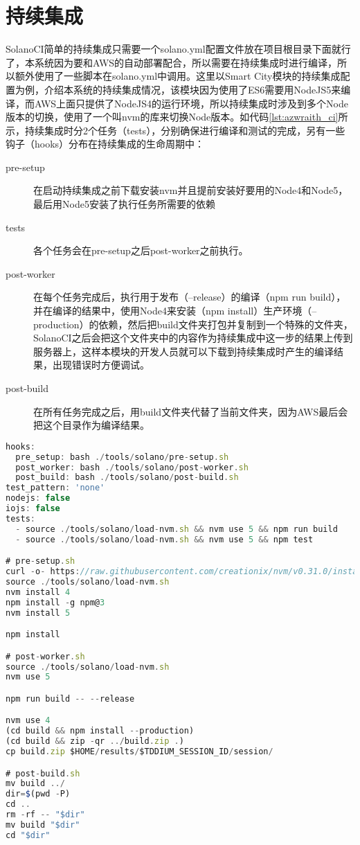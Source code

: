 \section{持续集成}
SolanoCI简单的持续集成只需要一个solano.yml配置文件放在项目根目录下面就行了，本系统因为要和AWS的自动部署配合，所以需要在持续集成时进行编译，所以额外使用了一些脚本在solano.yml中调用。这里以Smart City模块的持续集成配置为例，介绍本系统的持续集成情况，该模块因为使用了ES6需要用NodeJS5来编译，而AWS上面只提供了NodeJS4的运行环境，所以持续集成时涉及到多个Node版本的切换，使用了一个叫nvm的库来切换Node版本。如代码\ref{lst:azwraith_ci}所示，持续集成时分2个任务（tests），分别确保进行编译和测试的完成，另有一些钩子（hooks）分布在持续集成的生命周期中：
\begin{description}
  \item[pre-setup] 在启动持续集成之前下载安装nvm并且提前安装好要用的Node4和Node5，最后用Node5安装了执行任务所需要的依赖
  \item[tests] 各个任务会在pre-setup之后post-worker之前执行。
  \item[post-worker] 在每个任务完成后，执行用于发布（--release）的编译（npm run build），并在编译的结果中，使用Node4来安装（npm install）生产环境（--production）的依赖，然后把build文件夹打包并复制到一个特殊的文件夹，SolanoCI之后会把这个文件夹中的内容作为持续集成中这一步的结果上传到服务器上，这样本模块的开发人员就可以下载到持续集成时产生的编译结果，出现错误时方便调试。
  \item[post-build] 在所有任务完成之后，用build文件夹代替了当前文件夹，因为AWS最后会把这个目录作为编译结果。
\end{description}

\begin{lstlisting}[language={JavaScript}, label={lst:azwraith_ci}, caption={Smart City模块持续集成配置}]
hooks:
  pre_setup: bash ./tools/solano/pre-setup.sh
  post_worker: bash ./tools/solano/post-worker.sh
  post_build: bash ./tools/solano/post-build.sh
test_pattern: 'none'
nodejs: false
iojs: false
tests:
  - source ./tools/solano/load-nvm.sh && nvm use 5 && npm run build
  - source ./tools/solano/load-nvm.sh && nvm use 5 && npm test

# pre-setup.sh
curl -o- https://raw.githubusercontent.com/creationix/nvm/v0.31.0/install.sh | bash
source ./tools/solano/load-nvm.sh
nvm install 4
npm install -g npm@3
nvm install 5

npm install

# post-worker.sh
source ./tools/solano/load-nvm.sh
nvm use 5

npm run build -- --release

nvm use 4
(cd build && npm install --production)
(cd build && zip -qr ../build.zip .)
cp build.zip $HOME/results/$TDDIUM_SESSION_ID/session/

# post-build.sh
mv build ../
dir=$(pwd -P)
cd ..
rm -rf -- "$dir"
mv build "$dir"
cd "$dir"
\end{lstlisting}

